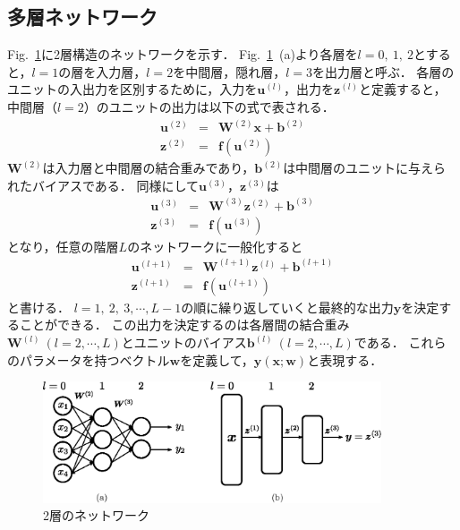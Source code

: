 \documentclass[a4paper,10pt]{jsarticle}
\begin{document}
\subsection{多層ネットワーク}
Fig.~\ref{fig:2層のネットワーク}に2層構造のネットワークを示す．
Fig.~\ref{fig:2層のネットワーク}~(a)より各層を$l=0,\ 1,\ 2$とすると，$l=1$の層を入力層，$l=2$を中間層，隠れ層，$l=3$を出力層と呼ぶ．
各層のユニットの入出力を区別するために，入力を$\bm{u}^{(l)}$，出力を$\bm{z}^{(l)}$と定義すると，中間層（$l=2$）のユニットの出力は以下の式で表される．
\begin{eqnarray}
\label{eq:3a}
  \bm{u}^{(2)} &=& \bm{W}^{(2)}\bm{x} + \bm{b}^{(2)} \\
  \bm{z}^{(2)} &=& \bm{f}(\bm{u}^{(2)})
\end{eqnarray}
$\bm{W}^{(2)}$は入力層と中間層の結合重みであり，$\bm{b}^{(2)}$は中間層のユニットに与えられたバイアスである．
同様にして$\bm{u}^{(3)}$，$\bm{z}^{(3)}$は
\begin{eqnarray}
\label{eq:3b}
  \bm{u}^{(3)} &=& \bm{W}^{(3)}\bm{z}^{(2)} + \bm{b}^{(3)} \\
  \bm{z}^{(3)} &=& \bm{f}(\bm{u}^{(3)})
\end{eqnarray}
となり，任意の階層$L$のネットワークに一般化すると
\begin{eqnarray}
\label{eq:3c}
  \bm{u}^{(l+1)} &=& \bm{W}^{(l+1)}\bm{z}^{(l)} + \bm{b}^{(l+1)} \\
  \bm{z}^{(l+1)} &=& \bm{f}(\bm{u}^{(l+1)})
\end{eqnarray}
と書ける．
$l=1,\ 2,\ 3,\cdots, L-1$の順に繰り返していくと最終的な出力$\bm{y}$を決定することができる．
この出力を決定するのは各層間の結合重み$\bm{W}^{(l)}\ (l=2,\cdots, L)$とユニットのバイアス$\bm{b}^{(l)}\ (l=2,\cdots, L)$である．
これらのパラメータを持つベクトル$\bm{w}$を定義して，$\bm{y}(\bm{x};\bm{w})$と表現する．

\begin{figure}[tb]
  \begin{center}
    \includegraphics[clip,width=10cm]{fig/eps/unit.eps}
  \end{center}
  \caption{2層のネットワーク}
  \label{fig:2層のネットワーク}
\end{figure}
\end{document}
